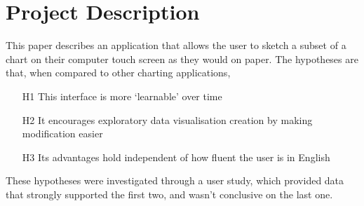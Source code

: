 \section{Project Description}
This paper describes an application that allows the user to sketch a subset of a chart on their computer touch screen as they would on paper. The hypotheses are that, when compared to other charting applications,

\begin{enumerate}
\item[H1] This interface is more `learnable' over time
\item[H2] It encourages exploratory data visualisation creation by making modification easier
\item[H3] Its advantages hold independent of how fluent the user is in English
\end{enumerate}

These hypotheses were investigated through a user study, which provided data that strongly supported the first two, and wasn't conclusive on the last one.

